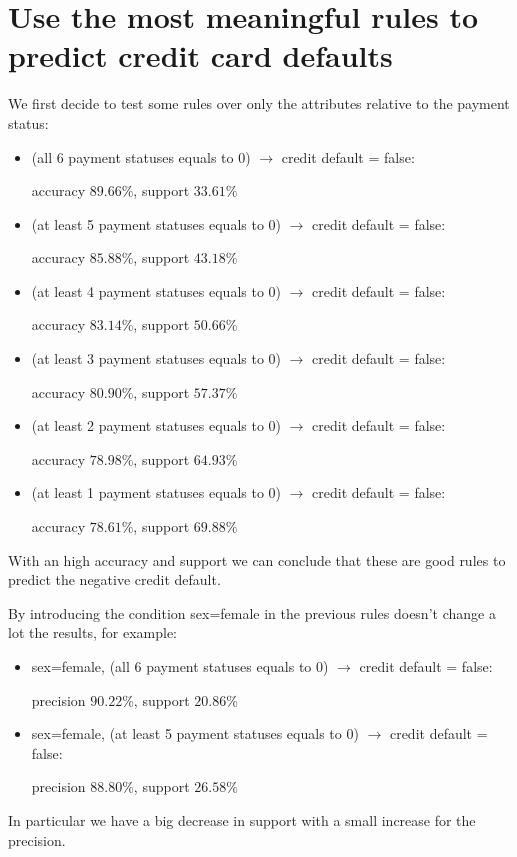 \clearpage

\section{Use the most meaningful rules to predict credit card defaults}

We first decide to test some rules over only the attributes relative to the payment status:

\begin{itemize}
  \item (all 6 payment statuses equals to 0) $\rightarrow$ credit default = false:
  
    \tab accuracy $89.66\%$, support $33.61\%$
  \item (at least 5 payment statuses equals to 0) $\rightarrow$ credit default = false:
  
    \tab accuracy $85.88\%$, support $43.18\%$
  \item (at least 4 payment statuses equals to 0) $\rightarrow$ credit default = false:
  
    \tab accuracy $83.14\%$, support $50.66\%$
  \item (at least 3 payment statuses equals to 0) $\rightarrow$ credit default = false:
  
    \tab accuracy $80.90\%$, support $57.37\%$
  \item (at least 2 payment statuses equals to 0) $\rightarrow$ credit default = false:
  
    \tab accuracy $78.98\%$, support $64.93\%$
  \item (at least 1 payment statuses equals to 0) $\rightarrow$ credit default = false:
  
    \tab accuracy $78.61\%$, support $69.88\%$

\end{itemize} 

With an high accuracy and support we can conclude that these are good rules to predict the negative credit default.

\smallskip

By introducing the condition sex=female in the previous rules doesn't change a lot the results, for example:

\begin{itemize}
  \item sex=female,  (all 6 payment statuses equals to 0) $\rightarrow$ credit default = false:
  
    \tab precision $90.22\%$, support $20.86\%$
  \item sex=female, (at least 5 payment statuses equals to 0) $\rightarrow$ credit default = false:
  
    \tab precision $88.80\%$, support $26.58\%$
\end{itemize}

In particular we have a big decrease in support with a small increase for the precision.
